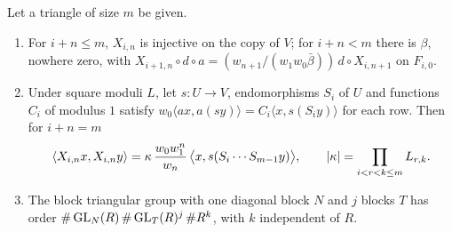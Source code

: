 \begin{theorem}\label{thm:triangle-chains}
Let a triangle of size $m$ be given.
\begin{enumerate}[label=\textup{(\alph*)}]
\item For $i+n\le m$, $X_{i,n}$ is injective on the copy of $V$; for $i+n<m$ there is $\beta$, nowhere zero, with $X_{i+1,n}\circ d\circ a=(w_{n+1}/(w_1w_0\bar\beta))\,d\circ X_{i,n+1}$ on $F_{i,0}$.
\item Under square moduli $L$, let $s\colon U\to V$, endomorphisms $S_i$ of $U$ and functions $C_i$ of modulus $1$ satisfy $w_0\langle ax,a(sy)\rangle=C_i\langle x,s(S_iy)\rangle$ for each row. Then for $i+n=m$
\[
  \langle X_{i,n}x,X_{i,n}y\rangle=\kappa\,\frac{w_0w_1^n}{w_n}\,\bigl\langle x,s(S_i\cdots S_{m-1}y)\bigr\rangle,\qquad\lvert \kappa\rvert=\prod_{i<r<k\le m}L_{r,k}.
\]
\item The block triangular group with one diagonal block $N$ and $j$ blocks $T$ has order $\#\operatorname{GL}_N(R)\,\#\operatorname{GL}_T(R)^j\,\#R^k$, with $k$ independent of $R$.
\end{enumerate}
\end{theorem}

